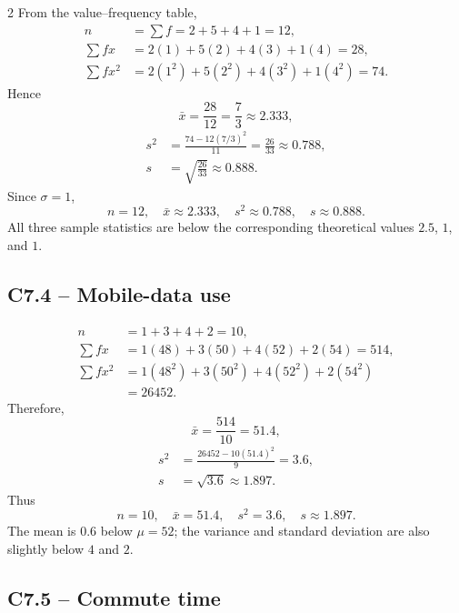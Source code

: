 \begin{multicols}{2}
		From the value--frequency table,
		\[
		\begin{aligned}
			n&=\sum f=2+5+4+1=12,\\
			\sum fx&=2(1)+5(2)+4(3)+1(4)=28,\\
			\sum fx^2&=2(1^2)+5(2^2)+4(3^2)+1(4^2)=74.
		\end{aligned}
		\]
		Hence
		\[
		\bar{x}=\frac{28}{12}=\frac73\approx2.333,
		\]
		\[
		\begin{aligned}
			s^2&=\frac{74-12(7/3)^2}{11}
			=\frac{26}{33}\approx0.788,\\
			s&=\sqrt{\frac{26}{33}}\approx0.888.
		\end{aligned}
		\]
		Since $\sigma=1$,
		\[
		\boxed{n=12,\quad\bar{x}\approx2.333,\quad s^2\approx0.788,
			\quad s\approx0.888.}
		\]
		All three sample statistics are below the corresponding theoretical values
		$2.5$, $1$, and $1$.
		
		
		\subsection*{C7.4 -- Mobile-data use}
		\label{subsec:c7-solution-mobile-data}
		
		\[
		\begin{aligned}
			n&=1+3+4+2=10,\\
			\sum fx&=1(48)+3(50)+4(52)+2(54)=514,\\
			\sum fx^2&=1(48^2)+3(50^2)+4(52^2)+2(54^2)\\
			&=26452.
		\end{aligned}
		\]
		Therefore,
		\[
		\bar{x}=\frac{514}{10}=51.4,
		\]
		\[
		\begin{aligned}
			s^2&=\frac{26452-10(51.4)^2}{9}=3.6,\\
			s&=\sqrt{3.6}\approx1.897.
		\end{aligned}
		\]
		Thus
		\[
		\boxed{n=10,\quad\bar{x}=51.4,\quad s^2=3.6,\quad s\approx1.897.}
		\]
		The mean is $0.6$ below $\mu=52$; the variance and standard deviation are
		also slightly below $4$ and $2$.
		
		
		\subsection*{C7.5 -- Commute time}
		\label{subsec:c7-solution-commute}
		

\end{multicols}

